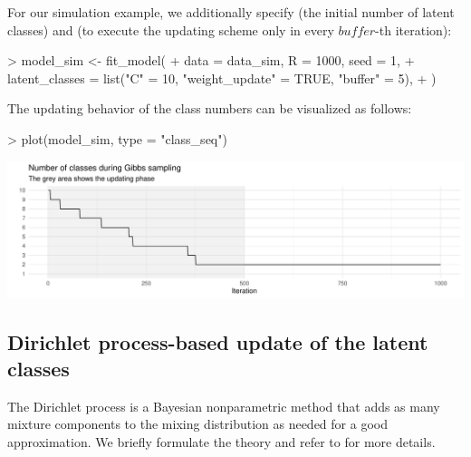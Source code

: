 \documentclass[article,shortnames]{jss}
\begin{document}
For our simulation example, we additionally specify  (the initial number of latent classes) and  (to execute the updating scheme only in every $buffer$-th iteration):

\begin{Schunk}
\begin{Sinput}
> model_sim <- fit_model(
+    data = data_sim, R = 1000, seed = 1,
+    latent_classes = list("C" = 10, "weight_update" = TRUE, "buffer" = 5),
+  )
\end{Sinput}
\end{Schunk}

The updating behavior of the class numbers can be visualized as follows:

\begin{Schunk}
\begin{Sinput}
> plot(model_sim, type = "class_seq")
\end{Sinput}
\end{Schunk}
\includegraphics{rprobitb_oelschlaeger_bauer-model-sim-class-seq}

\subsection{Dirichlet process-based update of the latent classes} \label{subsec:dp_update}

The Dirichlet process is a Bayesian nonparametric method that adds as many mixture components to the mixing distribution as needed for a good approximation. We briefly formulate the theory and refer to \cite{Neal:2000} for more details.
\end{document}
